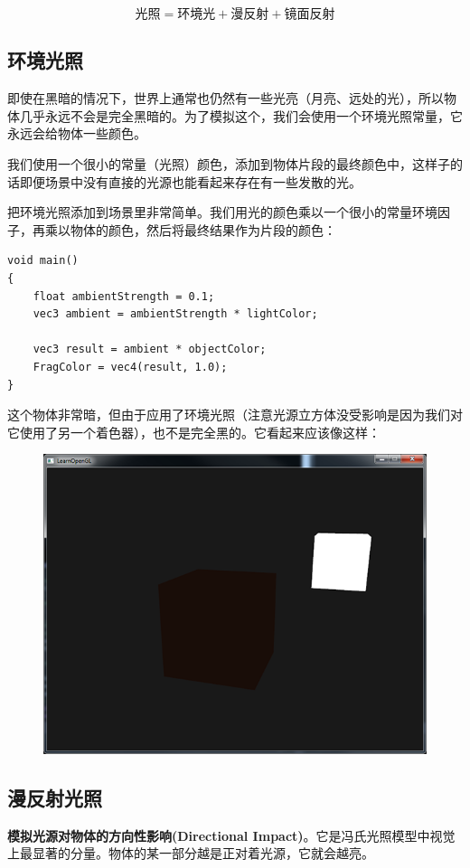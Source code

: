\documentclass[UTF8,a4paper,12pt]{ctexbook}
\begin{document}
			$$\textbf{光照} = \textbf{环境光} + \textbf{漫反射} +\textbf{镜面反射}$$
			
	
		\subsection{环境光照}
			即使在黑暗的情况下，世界上通常也仍然有一些光亮（月亮、远处的光），所以物体几乎永远不会是完全黑暗的。为了模拟这个，我们会使用一个环境光照常量，它永远会给物体一些颜色。
			
			我们使用一个很小的常量（光照）颜色，添加到物体片段的最终颜色中，这样子的话即便场景中没有直接的光源也能看起来存在有一些发散的光。
			
			把环境光照添加到场景里非常简单。我们用光的颜色乘以一个很小的常量环境因子，再乘以物体的颜色，然后将最终结果作为片段的颜色：
			
			\begin{lstlisting}
void main()
{
	float ambientStrength = 0.1;
	vec3 ambient = ambientStrength * lightColor;
	
	vec3 result = ambient * objectColor;
	FragColor = vec4(result, 1.0);
}			
			\end{lstlisting}
			
			这个物体非常暗，但由于应用了环境光照（注意光源立方体没受影响是因为我们对它使用了另一个着色器），也不是完全黑的。它看起来应该像这样：
			
			\begin{figure}[H]
				\centering
				\includegraphics[width=.83\linewidth]{ambient_lighting}
			\end{figure}
			
		\subsection{漫反射光照}
			\textbf{模拟光源对物体的方向性影响(Directional Impact)}。它是冯氏光照模型中视觉上最显著的分量。物体的某一部分越是正对着光源，它就会越亮。
			
\end{document}

